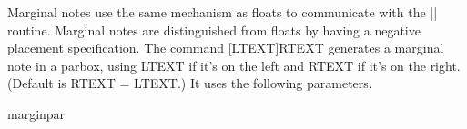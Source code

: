    Marginal notes use the same mechanism as floats to communicate
   with the |\output|  routine.  Marginal notes are distinguished from
   floats by having a negative placement specification.  The command
  [LTEXT]{RTEXT} generates a marginal note in a parbox,
    using LTEXT if it's on the left and RTEXT if it's on the right.
   (Default is RTEXT = LTEXT.)  It uses the following parameters.
%
%
%
%
%
%
%
%
%
 \begin{docCommand}{marginpar} {}
    \begin{teX}
\def\marginpar{%
  \ifhmode
    \@bsphack
    \@floatpenalty -\@Mii
  \else
    \@floatpenalty-\@Miii
  \fi
  \ifinner
    \@parmoderr
    \@floatpenalty\z@
  \else
    \@next\@currbox\@freelist{}{}%
    \@next\@marbox\@freelist{\global\count\@marbox\m@ne}%
       {\@floatpenalty\z@
        \@fltovf\def\@currbox{\@tempboxa}\def\@marbox{\@tempboxa}}%
  \fi
  \@ifnextchar [\@xmpar\@ympar}
    \end{teX}
 \end{docCommand}
